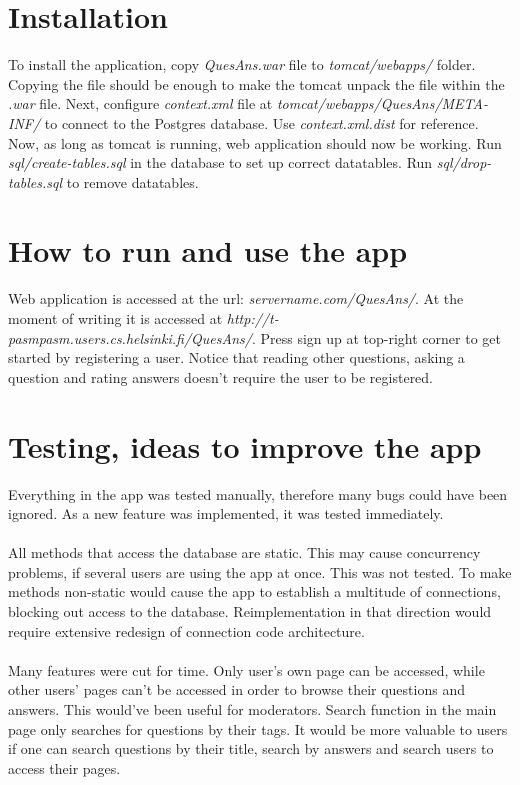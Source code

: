 \documentclass[a4paper,12pt]{article}
\begin{document}
\section{Installation}
To install the application, copy \emph{QuesAns.war} file to \emph{tomcat/webapps/} folder. Copying the file should be enough to make the tomcat unpack the file within the \emph{.war} file. \newline Next, configure \emph{context.xml} file at \emph{tomcat/webapps/QuesAns/META-INF/} to connect to the Postgres database. Use \emph{context.xml.dist} for reference. \newline
Now, as long as tomcat is running, web application should now be working. Run \emph{sql/create-tables.sql} in the database to set up correct datatables. Run \emph{sql/drop-tables.sql} to remove datatables.

\section{How to run and use the app}
Web application is accessed at the url: \emph{servername.com/QuesAns/}. At the moment of writing it is accessed at \emph{http://t-pasmpasm.users.cs.helsinki.fi/QuesAns/}. Press sign up at top-right corner to get started by registering a user. Notice that reading other questions, asking a question and rating answers doesn't require the user to be registered.

\section{Testing, ideas to improve the app}
Everything in the app was tested manually, therefore many bugs could have been ignored. As a new feature was implemented, it was tested immediately.\\
\\
All methods that access the database are static. This may cause concurrency problems, if several users are using the app at once. This was not tested. To make methods non-static would cause the app to establish a multitude of connections, blocking out access to the database. Reimplementation in that direction would require extensive redesign of connection code architecture.\\
\\
Many features were cut for time. Only user's own page can be accessed, while other users' pages can't be accessed in order to browse their questions and answers. This would've been useful for moderators. Search function in the main page only searches for questions by their tags. It would be more valuable to users if one can search questions by their title, search by answers and search users to access their pages.
\newpage
\end{document}
